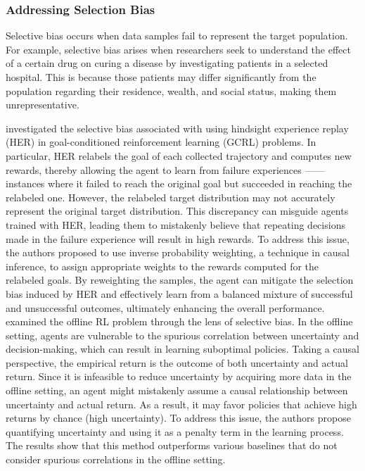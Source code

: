 \documentclass[10pt]{article} %
\theoremstyle{definition}
\begin{document}
\subsubsection{Addressing Selection Bias}

Selective bias occurs when data samples fail to represent the target population. For example, selective bias arises when researchers seek to understand the effect of a certain drug on curing a disease by investigating patients in a selected hospital. This is because those patients may differ significantly from the population regarding their residence, wealth, and social status, making them unrepresentative. 

\citet{baiAddressingHindsightBias2021} investigated the selective bias associated with using hindsight experience replay (HER) in goal-conditioned reinforcement learning (GCRL) problems. In particular, HER relabels the goal of each collected trajectory and computes new rewards, thereby allowing the agent to learn from failure experiences —— instances where it failed to reach the original goal but succeeded in reaching the relabeled one. However, the relabeled target distribution may not accurately represent the original target distribution. This discrepancy can misguide agents trained with HER, leading them to mistakenly believe that repeating decisions made in the failure experience will result in high rewards. To address this issue, the authors proposed to use inverse probability weighting, a technique in causal inference,  to assign appropriate weights to the rewards computed for the relabeled goals. By reweighting the samples, the agent can mitigate the selection bias induced by HER and effectively learn from a balanced mixture of successful and unsuccessful outcomes, ultimately enhancing the overall performance. 
\citet{dengSCORESpuriousCOrrelation2021a} examined the offline RL problem through the lens of selective bias. In the offline setting, agents are vulnerable to the spurious correlation between uncertainty and decision-making, which can result in learning suboptimal policies. Taking a causal perspective, the empirical return is the outcome of both uncertainty and actual return. Since it is infeasible to reduce uncertainty by acquiring more data in the offline setting, an agent might mistakenly assume a causal relationship between uncertainty and actual return. As a result, it may favor policies that achieve high returns by chance (high uncertainty). To address this issue, the authors propose quantifying uncertainty and using it as a penalty term in the learning process. The results show that this method outperforms various baselines that do not consider spurious correlations in the offline setting.
\end{document}
